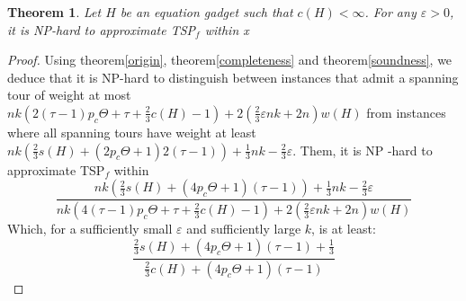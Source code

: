 \documentclass[12pt]{article}
\newtheorem{theorem}{Theorem}
\begin{document}
\begin{theorem}
    Let $H$ be an equation gadget such that $c(H)<\infty$. For any $\varepsilon>0$, it is NP-hard to approximate TSP$_f$ within x
\end{theorem}
\begin{proof}
    Using theorem\ref{origin}, theorem\ref{completeness} and theorem\ref{soundness}, 
    we deduce that it is NP-hard to distinguish between instances that admit a spanning tour of weight 
    at most $nk(2 (\tau-1)p_c\Theta+\tau+\frac{2}{3}c(H)-1)+ 2(\frac{2}{3}\varepsilon nk +2n)w(H)$ from instances where all spanning tours have weight at least $nk(\frac{2}{3}s(H)+(2p_c\Theta +1)2 (\tau-1))+\frac{1}{3}nk-\frac{2}{3}\varepsilon$.
    Them, it is NP -hard to approximate TSP$_f$ within
    \[ \frac{nk(\frac{2}{3}s(H)+(4p_c\Theta +1)(\tau-1))+\frac{1}{3}nk-\frac{2}{3}\varepsilon}{nk(4 (\tau-1)p_c\Theta+\tau+\frac{2}{3}c(H)-1)+ 2(\frac{2}{3}\varepsilon nk +2n)w(H)}\]
    Which, for a sufficiently small $\varepsilon$ and sufficiently large $k$, is at least:
    \[ \frac{\frac{2}{3}s(H)+(4p_c\Theta +1)(\tau-1)+\frac{1}{3}}{\frac{2}{3}c(H)+(4p_c\Theta+1)(\tau-1)}\]


\end{proof}
\end{document}
